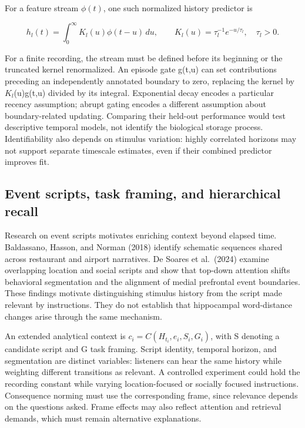 \documentclass[11pt]{article}
\begin{document}
For a feature stream \(\phi(t)\), one such normalized history predictor
is

\begin{equation}
h_l(t)=\int_0^\infty K_l(u)\phi(t-u)\,du,\qquad
K_l(u)=\tau_l^{-1}e^{-u/\tau_l},\quad \tau_l>0.
\end{equation}

For a finite recording, the stream must be defined before its beginning
or the truncated kernel renormalized. An episode gate g(t,u) can set
contributions preceding an independently annotated boundary to zero,
replacing the kernel by \(K_l\)(u)g(t,u) divided by its integral.
Exponential decay encodes a particular recency assumption; abrupt gating
encodes a different assumption about boundary-related updating.
Comparing their held-out performance would test descriptive temporal
models, not identify the biological storage process. Identifiability
also depends on stimulus variation: highly correlated horizons may not
support separate timescale estimates, even if their combined predictor
improves fit.

\hypertarget{event-scripts-task-framing-and-hierarchical-recall}{%
\subsection{Event scripts, task framing, and hierarchical
recall}\label{event-scripts-task-framing-and-hierarchical-recall}}

Research on event scripts motivates enriching context beyond elapsed
time. Baldassano, Hasson, and Norman (2018) identify schematic sequences
shared across restaurant and airport narratives. De Soares et al.~(2024)
examine overlapping location and social scripts and show that top-down
attention shifts behavioral segmentation and the alignment of medial
prefrontal event boundaries. These findings motivate distinguishing
stimulus history from the script made relevant by instructions. They do
not establish that hippocampal word-distance changes arise through the
same mechanism.

An extended analytical context is \(c_i=C(H_{t_i},e_i,S_i,G_i)\), with S
denoting a candidate script and G task framing. Script identity,
temporal horizon, and segmentation are distinct variables: listeners can
hear the same history while weighting different transitions as relevant.
A controlled experiment could hold the recording constant while varying
location-focused or socially focused instructions. Consequence norming
must use the corresponding frame, since relevance depends on the
questions asked. Frame effects may also reflect attention and retrieval
demands, which must remain alternative explanations.
\end{document}
